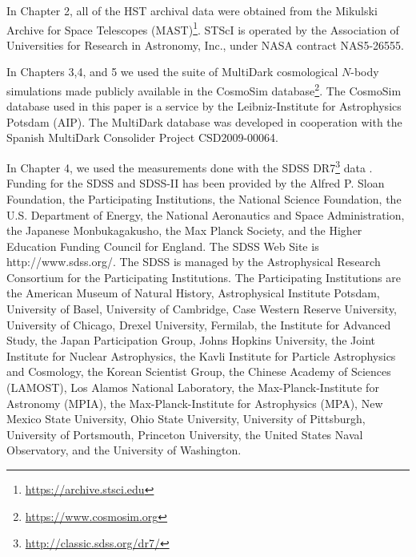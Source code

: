 


In Chapter 2, all of the HST archival data were obtained from the Mikulski Archive for Space Telescopes (MAST)\footnote{\url{https://archive.stsci.edu}}. STScI is operated by the Association of Universities for Research in Astronomy, Inc., under NASA contract NAS5-26555.
 
In Chapters 3,4, and 5 we used the suite of MultiDark cosmological $N$-body simulations made publicly available in the CosmoSim database\footnote{\url{https://www.cosmosim.org}}. The CosmoSim database used in this paper is a service by the Leibniz-Institute for Astrophysics Potsdam (AIP). The MultiDark database was developed in cooperation with the Spanish MultiDark Consolider Project CSD2009-00064.

In Chapter 4, we used the measurements done with the SDSS DR7\footnote{\url{http://classic.sdss.org/dr7/}} data \citep{abazajian2009}. 
Funding for the SDSS and SDSS-II has been provided by the Alfred P. Sloan Foundation, the Participating Institutions, the National Science Foundation, the U.S. Department of Energy, the National Aeronautics and Space Administration, the Japanese Monbukagakusho, the Max Planck Society, and the Higher Education Funding Council for England. The SDSS Web Site is http://www.sdss.org/. The SDSS is managed by the Astrophysical Research Consortium for the Participating Institutions. The Participating Institutions are the American Museum of Natural History, Astrophysical Institute Potsdam, University of Basel, University of Cambridge, Case Western Reserve University, University of Chicago, Drexel University, Fermilab, the Institute for Advanced Study, the Japan Participation Group, Johns Hopkins University, the Joint Institute for Nuclear Astrophysics, the Kavli Institute for Particle Astrophysics and Cosmology, the Korean Scientist Group, the Chinese Academy of Sciences (LAMOST), Los Alamos National Laboratory, the Max-Planck-Institute for Astronomy (MPIA), the Max-Planck-Institute for Astrophysics (MPA), New Mexico State University, Ohio State University, University of Pittsburgh, University of Portsmouth, Princeton University, the United States Naval Observatory, and the University of Washington.

